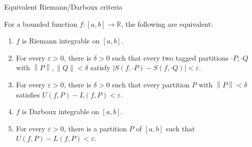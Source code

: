 \begin{theorem}{Equivalent Riemann/Darboux criteria}

For a bounded function \(f:\left\lbrack {a,b} \right\rbrack\rightarrow\mathbb{R}\), the following are equivalent:

\begin{enumerate}
\tightlist
\item
  \(f\) is Riemann integrable on \(\left\lbrack {a,b} \right\rbrack\).
\item
  For every \(\varepsilon > 0\), there is \(\delta > 0\) such that every two tagged partitions \(\cdot P, \cdot Q\) with \(\left\| P \right\|,\left\| Q \right\| < \delta\) satisfy \(\left| {S\left( {f, \cdot P} \right) - S\left( {f, \cdot Q} \right)} \right| < \varepsilon\).
\item
  For every \(\varepsilon > 0\), there is \(\delta > 0\) such that every partition \(P\) with \(\left\| P \right\| < \delta\) satisfies \(U\left( {f,P} \right) - L\left( {f,P} \right) < \varepsilon\).
\item
  \(f\) is Darboux integrable on \(\left\lbrack {a,b} \right\rbrack\).
\item
  For every \(\varepsilon > 0\), there is a partition \(P\) of \(\left\lbrack {a,b} \right\rbrack\) such that \(U\left( {f,P} \right) - L\left( {f,P} \right) < \varepsilon\).
\end{enumerate}

\end{theorem}

